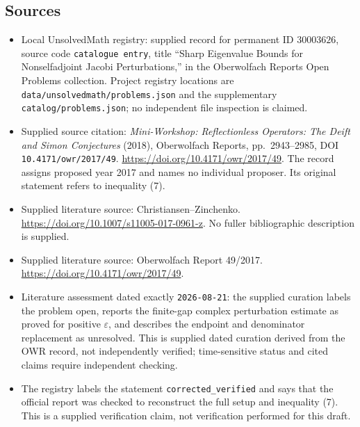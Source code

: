 \documentclass[11pt]{article}
\begin{document}
\subsection{Sources}
\begin{itemize}
\item Local UnsolvedMath registry: supplied record for permanent ID \(30003626\), source code \texttt{catalogue entry}, title ``Sharp Eigenvalue Bounds for Nonselfadjoint Jacobi Perturbations,'' in the Oberwolfach Reports Open Problems collection. Project registry locations are \texttt{data/unsolvedmath/problems.json} and the supplementary \texttt{catalog/problems.json}; no independent file inspection is claimed.
\item Supplied source citation: \emph{Mini-Workshop: Reflectionless Operators: The Deift and Simon Conjectures} (2018), Oberwolfach Reports, pp.\ 2943--2985, DOI \texttt{10.4171/owr/2017/49}. \url{https://doi.org/10.4171/owr/2017/49}. The record assigns proposed year 2017 and names no individual proposer. Its original statement refers to inequality (7).
\item Supplied literature source: Christiansen--Zinchenko. \url{https://doi.org/10.1007/s11005-017-0961-z}. No fuller bibliographic description is supplied.
\item Supplied literature source: Oberwolfach Report 49/2017. \url{https://doi.org/10.4171/owr/2017/49}.
\item Literature assessment dated exactly \texttt{2026-08-21}: the supplied curation labels the problem open, reports the finite-gap complex perturbation estimate as proved for positive \(\varepsilon\), and describes the endpoint and denominator replacement as unresolved. This is supplied dated curation derived from the OWR record, not independently verified; time-sensitive status and cited claims require independent checking.
\item The registry labels the statement \texttt{corrected\_verified} and says that the official report was checked to reconstruct the full setup and inequality (7). This is a supplied verification claim, not verification performed for this draft.
\end{itemize}
\end{document}

